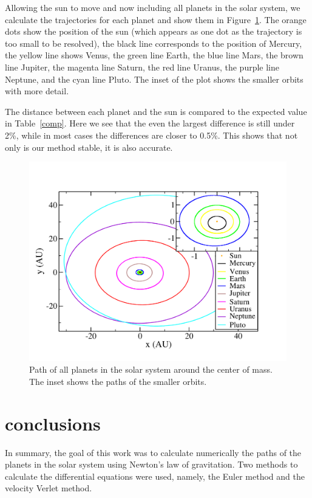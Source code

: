 \documentclass[prc,amsmath,twocolumn,superscriptaddress]{revtex4}
\begin{document}
Allowing the sun to move and now including all planets in the solar system, we calculate the trajectories for each planet and show them in Figure~\ref{all}. The orange dots show the position of the sun (which appears as one dot as the trajectory is too small to be resolved), the black line corresponds to the position of Mercury, the yellow line shows Venus, the green line Earth, the blue line Mars, the brown line Jupiter, the magenta line Saturn, the red line Uranus, the purple line Neptune, and the cyan line Pluto. The inset of the plot shows the smaller orbits with more detail. 

The distance between each planet and the sun is compared to the expected value in Table~\ref{comp}. Here we see that the even the largest difference is still under 2\%, while in most cases the differences are closer to 0.5\%. This shows that not only is our method stable, it is also accurate.

\begin{figure}[b]
\includegraphics[scale=0.33]{all2.pdf}
\caption{Path of all planets in the solar system around the center of mass. The inset shows the paths of the smaller orbits.}
\label{all}
\end{figure}

\section{conclusions}
\label{conc}

In summary, the goal of this work was to calculate numerically the paths of the planets in the solar system using Newton's law of gravitation. Two methods to calculate the differential equations were used, namely, the Euler method and the velocity Verlet method.
\end{document}
